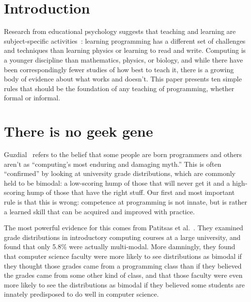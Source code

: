 \documentclass[10pt,letterpaper]{article}
\newcommand{\rulemajor}[2]{\section{#1}\label{#2}}
\begin{document}


\section*{Introduction}

Research from educational psychology suggests that teaching and learning are subject-specific
activities~\cite{mayer-subject}: learning programming has a different set of challenges and techniques
than learning physics or learning to read and write.  Computing is a younger discipline than
mathematics, physics, or biology, and while there have been correspondingly fewer studies of how best to teach it,
there is a growing body of evidence about what works and doesn't.
This paper presents ten simple rules that should be the foundation of any teaching of programming, whether
formal or informal.

\rulemajor{There is no geek gene}{gene}

Guzdial~\cite{guzdial-myths} refers to the belief that some people are born programmers and others aren't
as ``computing's most enduring and damaging myth.''
This is often ``confirmed'' by looking at university grade distributions,
which are commonly held to be bimodal:
a low-scoring hump of those that will never get it
and a high-scoring hump of those that have the right stuff.
Our first and most important rule is that this is wrong:
competence at programming is not innate,
but is rather a learned skill that can be acquired and improved with practice.

The most powerful evidence for this comes from Patitsas et al.~\cite{patitsas-bimodal}.
They examined grade distributions in introductory computing courses at a large university,
and found that only 5.8\% were actually multi-modal.
More damningly,
they found that computer science faculty were more likely to see distributions as bimodal
if they thought those grades came from a programming class
than if they believed the grades came from some other kind of class,
and that those faculty were even more likely to see the distributions as bimodal
if they believed some students are innately predisposed to do well in computer science.
\end{document}
